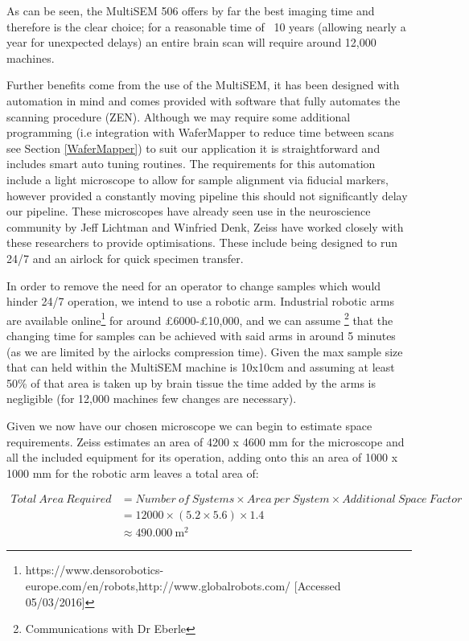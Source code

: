 \documentclass[a4paper, 11pt]{article}
\numberwithin{equation}{section}
\begin{document}
As can be seen, the MultiSEM 506 offers by far the best imaging time and therefore is the clear choice; for a reasonable time of ~10 years (allowing nearly a year for unexpected delays) an entire brain scan will require around 12,000 machines.




Further benefits come from the use of the MultiSEM,  it has been designed with automation in mind and comes provided with software that fully automates the scanning procedure (ZEN). Although we may require some additional programming (i.e integration with WaferMapper to reduce time between scans see Section \ref{WaferMapper}) to suit our application it is straightforward and includes smart auto tuning routines. The requirements for this automation include a light microscope to allow for sample alignment via fiducial markers, however provided a constantly moving pipeline this should not significantly delay our pipeline. These microscopes have already seen use in the neuroscience community by Jeff Lichtman and Winfried Denk, Zeiss have worked closely with these researchers to provide optimisations. These include being designed to run 24/7 and an airlock for quick specimen transfer\cite{ZeissMulti}. 

In order to remove the need for an operator to change samples which would hinder 24/7 operation, we intend to use a robotic arm. Industrial robotic arms are available online\footnote{https://www.densorobotics-europe.com/en/robots,http://www.globalrobots.com/ [Accessed 05/03/2016]} for around \pounds6000-\pounds10,000, and we can assume \footnote{Communications with Dr Eberle} that the changing time for samples can be achieved with said arms in around 5 minutes (as we are limited by the airlocks compression time). Given the max sample size that can held within the MultiSEM machine is 10x10cm  \cite{ZeissMulti} and assuming at least 50\% of that area is taken up by brain tissue the time added by the arms is negligible (for 12,000 machines few changes are necessary). 

Given we now have our chosen microscope we can begin to estimate space requirements. Zeiss estimates an area of 4200 x 4600 mm for the microscope and all the included equipment for its operation\cite{ZeissMulti}, adding onto this an area of 1000 x 1000 mm for the robotic arm leaves a total area of:



\begin{align}
	Total\ Area\ Required &= Number\ of\ Systems \times Area\ per\ System \times Additional\ Space\ Factor\nonumber\\
	&= 12000 \times (5.2\times5.6)\times1.4\nonumber \\
	&\approx \SI{490, 000}{\meter^2}
\end{align}
\end{document}
